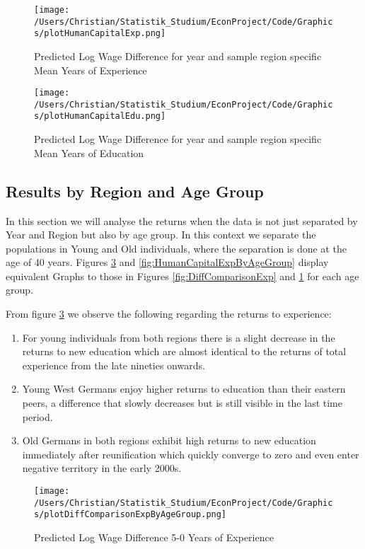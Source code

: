 \documentclass{article}
\begin{document}
\begin{figure}[!h]
    \centering
    \texttt{[image: /Users/Christian/Statistik\_Studium/EconProject/Code/Graphics/plotHumanCapitalExp.png]}
    \caption{Predicted Log Wage Difference for year and sample region specific Mean Years of Experience}
    \label{fig:HumanCapitalExp}
\end{figure}

\begin{figure}[!h]
    \centering
    \texttt{[image: /Users/Christian/Statistik\_Studium/EconProject/Code/Graphics/plotHumanCapitalEdu.png]}
    \caption{Predicted Log Wage Difference for year and sample region specific Mean Years of Education}
    \label{fig:HumanCapitalEdu}
\end{figure}

\FloatBarrier
\subsection{Results by Region and Age Group}
In this section we will analyse the returns when the data is not just separated by Year and Region but also by age group. In this context we separate the populations in Young and Old individuals, where the separation is done at the age of 40 years. Figures \ref{fig:DiffComparisonExpByAgeGroup} and \ref{fig:HumanCapitalExpByAgeGroup} display equivalent Graphs to those in Figures  \ref{fig:DiffComparisonExp} and \ref{fig:HumanCapitalExp} for each age group.

From figure \ref{fig:DiffComparisonExpByAgeGroup} we observe the following regarding the returns to experience:

\begin{enumerate}
	\item For young individuals from both regions there is a slight decrease in the returns to new education which are almost identical to the returns of total experience from the late nineties onwards.
	\item Young West Germans enjoy higher returns to education than their eastern peers, a difference that slowly decreases but is still visible in the last time period.
	\item Old Germans in both regions exhibit high returns to new education immediately after reunification which quickly converge to zero and even enter negative territory in the early 2000s.
\end{enumerate}

\begin{figure}[!h]
    \centering
    \texttt{[image: /Users/Christian/Statistik\_Studium/EconProject/Code/Graphics/plotDiffComparisonExpByAgeGroup.png]}
    \caption{Predicted Log Wage Difference 5-0 Years of Experience}
    \label{fig:DiffComparisonExpByAgeGroup}
\end{figure}
\end{document}
